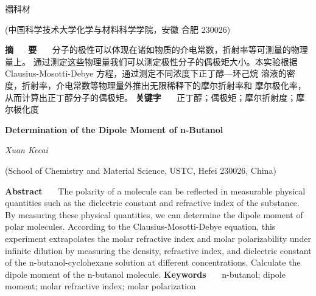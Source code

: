 \documentclass[12pt]{ctexart}
\numberwithin{equation}{section}
\begin{document}
\nocite{*}

\begin{center}
    \heiti {}

    \vspace{12pt}

    \kaishu \fontsize{13.75pt}{0}禤科材


    \vspace{5pt}

    \songti \fontsize{12pt}{0}(中国科学技术大学化学与材料科学学院，安徽 合肥 230026)
\end{center}

\noindent\textbf{摘~~~\!要}~~~\!
分子的极性可以体现在诸如物质的介电常数，折射率等可测量的物理量上。
通过测定这些物理量我们可以测定极性分子的偶极矩大小。本实验根据
Clausius-Mosotti-Debye 方程，通过测定不同浓度下正丁醇—环己烷
溶液的密度，折射率，介电常数等物理量外推出无限稀释下的摩尔折射率和
摩尔极化率，从而计算出正丁醇分子的偶极矩。
\newline
\textbf{关键字}~~~\!
正丁醇；偶极矩；摩尔折射度；摩尔极化度

\begin{center}
    {\LARGE\rmfamily\textbf{Determination of the Dipole Moment of n-Butanol}}

    \vspace{12pt}

    {\slshape Xuan Kecai}

    \vspace{5pt}

    (School of Chemistry and Material Science, USTC, Hefei 230026, China)
\end{center}

\noindent\textbf{Abstract}~~~\!
The polarity of a molecule can be reflected in measurable
physical quantities such as the dielectric constant and
refractive index of the substance. By measuring these
physical quantities, we can determine the dipole moment of
polar molecules. According to the Clausius-Mosotti-Debye
equation, this experiment extrapolates the molar refractive
index and molar polarizability under infinite dilution by
measuring the density, refractive index, and dielectric
constant of the n-butanol-cyclohexane solution at different
concentrations. Calculate the dipole moment of the n-butanol
molecule.
\newline
\textbf{Keywords}~~~\!
n-butanol; dipole moment; molar refractive index;
molar polarization
\end{document}
